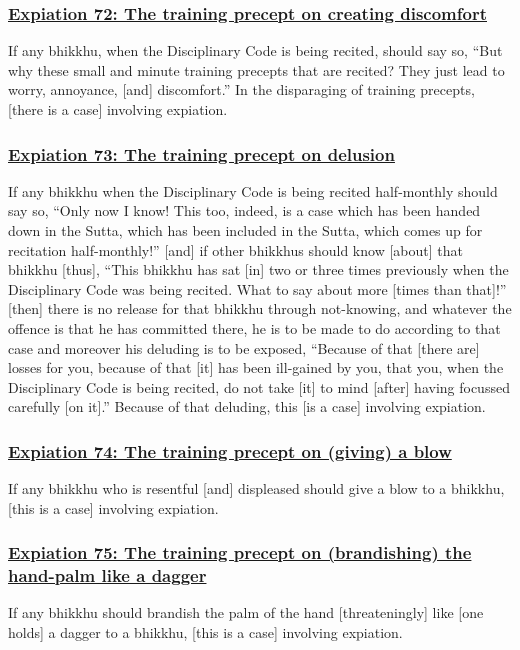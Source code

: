 \subsubsection*{\hyperref[pac72]{Expiation 72: The training precept on creating discomfort}}
\label{exp72}
If any bhikkhu, when the Disciplinary Code is being recited, should say so, ``But why these small and minute training precepts that are recited? They just lead to worry, annoyance, [and] discomfort.'' In the disparaging of training precepts, [there is a case] involving expiation.



\subsubsection*{\hyperref[pac73]{Expiation 73: The training precept on delusion}}
\label{exp73}
If any bhikkhu when the Disciplinary Code is being recited half-monthly should say so, ``Only now I know! This too, indeed, is a case which has been handed down in the Sutta, which has been included in the Sutta, which comes up for recitation half-monthly!'' [and] if other bhikkhus should know [about] that bhikkhu [thus], ``This bhikkhu has sat [in] two or three times previously when the Disciplinary Code was being recited. What to say about more [times than that]!'' [then] there is no release for that bhikkhu through not-knowing, and whatever the offence is that he has committed there, he is to be made to do according to that case and moreover his deluding is to be exposed, ``Because of that [there are] losses for you, because of that [it] has been ill-gained by you, that you, when the Disciplinary Code is being recited, do not take [it] to mind [after] having focussed carefully [on it].'' Because of that deluding, this [is a case] involving expiation.



\subsubsection*{\hyperref[pac74]{Expiation 74: The training precept on (giving) a blow}}
\label{exp74}
If any bhikkhu who is resentful [and] displeased should give a blow to a bhikkhu, [this is a case] involving expiation.



\subsubsection*{\hyperref[pac75]{Expiation 75: The training precept on (brandishing) the hand-palm like a dagger}}
\label{exp75}
If any bhikkhu should brandish the palm of the hand [threateningly] like [one holds] a dagger to a bhikkhu, [this is a case] involving expiation.



